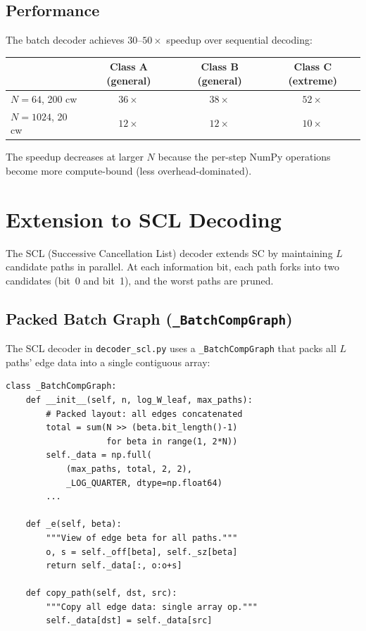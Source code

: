 \documentclass[11pt,a4paper]{article}
\begin{document}
\subsection{Performance}

The batch decoder achieves $30$--$50\times$ speedup over sequential decoding:

\begin{center}
\begin{tabular}{lccc}
\toprule
& Class A (general) & Class B (general) & Class C (extreme) \\
\midrule
$N = 64$, 200 cw & $36\times$ & $38\times$ & $52\times$ \\
$N = 1024$, 20 cw & $12\times$ & $12\times$ & $10\times$ \\
\bottomrule
\end{tabular}
\end{center}

The speedup decreases at larger $N$ because the per-step NumPy operations become more compute-bound (less overhead-dominated).


\section{Extension to SCL Decoding}
\label{sec:scl}

The SCL (Successive Cancellation List) decoder extends SC by maintaining $L$ candidate paths in parallel. At each information bit, each path forks into two candidates (bit~0 and bit~1), and the worst paths are pruned.

\subsection{Packed Batch Graph (\texttt{\_BatchCompGraph})}

The SCL decoder in \texttt{decoder\_scl.py} uses a \texttt{\_BatchCompGraph} that packs all $L$ paths' edge data into a single contiguous array:

\begin{lstlisting}[caption={SCL packed graph (\texttt{\_BatchCompGraph})}]
class _BatchCompGraph:
    def __init__(self, n, log_W_leaf, max_paths):
        # Packed layout: all edges concatenated
        total = sum(N >> (beta.bit_length()-1)
                    for beta in range(1, 2*N))
        self._data = np.full(
            (max_paths, total, 2, 2),
            _LOG_QUARTER, dtype=np.float64)
        ...

    def _e(self, beta):
        """View of edge beta for all paths."""
        o, s = self._off[beta], self._sz[beta]
        return self._data[:, o:o+s]

    def copy_path(self, dst, src):
        """Copy all edge data: single array op."""
        self._data[dst] = self._data[src]
\end{lstlisting}
\end{document}
